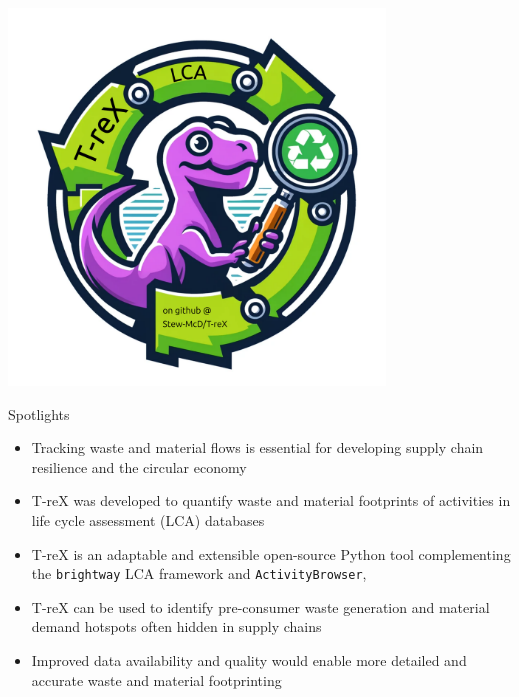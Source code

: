 \documentclass[review,3p,authoryear]{elsarticle}
\renewcommand{\texttt}[1]{{\ttfamily\small\nolinkurl{#1}}}
\begin{document}
\vspace{20em}
\includegraphics[width=10cm]{graphical-abstract.pdf}

\clearpage
\linenumbers{}


{\Large Spotlights}
\vspace{1em}
\begin{itemize}
    \item Tracking waste and material flows is essential for developing supply chain resilience and the circular economy
    \item T-reX was developed to quantify waste and material footprints of activities in life cycle assessment (LCA) databases
    \item T-reX is an adaptable and extensible open-source Python tool complementing the \texttt{brightway} LCA framework and \texttt{ActivityBrowser},
    \item T-reX can be used to identify pre-consumer waste generation and material demand hotspots often hidden in supply chains
    \item Improved data availability and quality would enable more detailed and accurate waste and material footprinting
\end{itemize}
\end{document}
